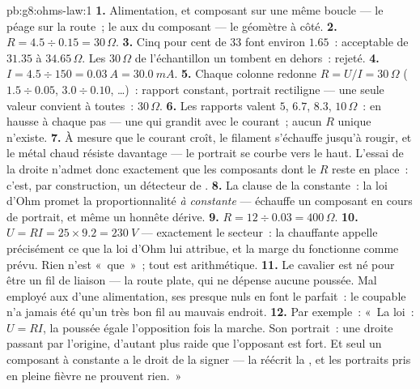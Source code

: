\begin{solution}{pb:g8:ohms-law:1}
\textbf{1.} Alimentation,  et composant sur une même
boucle  --- le péage sur la route~; le  aux 
du composant --- le géomètre à côté.
\textbf{2.} $R = 4.5 \div 0.15 = 30\,\Omega$.
\textbf{3.} Cinq pour cent de $33$ font environ $1.65$~: acceptable
de $31.35$ à $34.65\,\Omega$. Les $30\,\Omega$ de l'échantillon un
tombent en dehors~: rejeté.
\textbf{4.} $I = 4.5 \div 150 = \qty{0.03}{A} = \qty{30.0}{mA}$.
\textbf{5.} Chaque colonne redonne $R = U/I = 30\,\Omega$
($1.5 \div 0.05$, $3.0 \div 0.10$, \dots)~: rapport constant,
portrait rectiligne --- une seule valeur convient à toutes~:
$30\,\Omega$.
\textbf{6.} Les rapports valent $5$, $6.7$, $8.3$, $10\,\Omega$~:
en hausse à chaque pas --- une  qui grandit avec le
courant~; aucun $R$ unique n'existe.
\textbf{7.} À mesure que le courant croît, le filament s'échauffe
jusqu'à rougir, et le métal chaud résiste davantage --- le portrait
se courbe vers le haut. L'essai de la droite n'admet donc
exactement que les composants dont le $R$ reste en place~: c'est,
par construction, un détecteur de .
\textbf{8.} La clause de la  constante~: la loi d'Ohm
promet la proportionnalité \emph{à  constante} ---
échauffe un composant en cours de portrait, et même un 
honnête dérive.
\textbf{9.} $R = 12 \div 0.03 = 400\,\Omega$.
\textbf{10.} $U = R I = 25 \times 9.2 = \qty{230}{V}$ --- exactement
le secteur~: la  chauffante appelle précisément ce que la
loi d'Ohm lui attribue, et la marge du  fonctionne comme
prévu. Rien n'est «~que~»~; tout est arithmétique.
\textbf{11.} Le cavalier est né pour être un fil de liaison --- la
route plate, qui ne dépense aucune poussée. Mal employé aux 
d'une alimentation, ses  presque nuls en font le 
parfait~: le coupable n'a jamais été qu'un très bon fil au mauvais
endroit.
\textbf{12.} Par exemple~: «~La loi~: $U = R I$, la poussée égale
l'opposition fois la marche. Son portrait~: une droite passant par
l'origine, d'autant plus raide que l'opposant est fort. Et seul un
composant à  constante a le droit de la signer --- la
 réécrit la , et les portraits pris en pleine
fièvre ne prouvent rien.~»
\end{solution}
